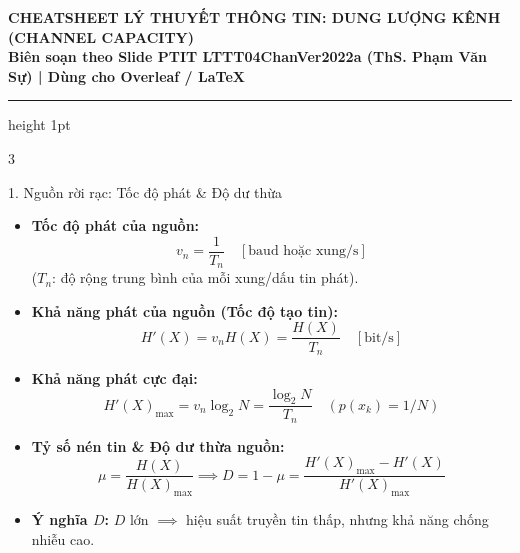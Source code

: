 \documentclass[10pt,landscape,a4paper]{article}
\begin{document}
\begin{center}
    {\Large\textbf{\color{accent}CHEATSHEET LÝ THUYẾT THÔNG TIN: DUNG LƯỢNG KÊNH (CHANNEL CAPACITY)}}\\[2pt]
    {\footnotesize\textbf{Biên soạn theo Slide PTIT LTTT04ChanVer2022a (ThS. Phạm Văn Sự) | Dùng cho Overleaf / LaTeX}}
\end{center}
\vspace{-4pt}
\hrule height 1pt
\vspace{4pt}

\begin{multicols*}{3}

\begin{cheatbox}{1. Nguồn rời rạc: Tốc độ phát \& Độ dư thừa}
\begin{itemize}[leftmargin=*,noitemsep]
    \item \textbf{Tốc độ phát của nguồn:}
    \[ v_n = \frac{1}{T_n} \quad [\text{baud hoặc xung/s}] \]
    ($T_n$: độ rộng trung bình của mỗi xung/dấu tin phát).
    \item \textbf{Khả năng phát của nguồn (Tốc độ tạo tin):}
    \[ H'(X) = v_n H(X) = \frac{H(X)}{T_n} \quad [\text{bit/s}] \]
    \item \textbf{Khả năng phát cực đại:}
    \[ H'(X)_{\max} = v_n \log_2 N = \frac{\log_2 N}{T_n} \quad (p(x_k) = 1/N) \]
    \item \textbf{Tỷ số nén tin \& Độ dư thừa nguồn:}
    \[ \mu = \frac{H(X)}{H(X)_{\max}} \implies D = 1 - \mu = \frac{H'(X)_{\max} - H'(X)}{H'(X)_{\max}} \]
    \item \textbf{Ý nghĩa $D$:} $D$ lớn $\implies$ hiệu suất truyền tin thấp, nhưng khả năng chống nhiễu cao.
\end{itemize}
\end{cheatbox}


\end{multicols*}
\end{document}
